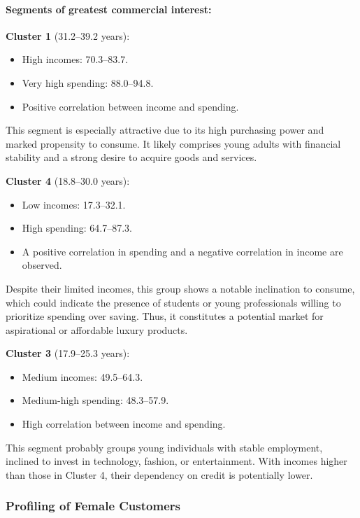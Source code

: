 \documentclass[10pt]{article}
\begin{document}
\paragraph{Segments of greatest commercial interest:}

\textbf{Cluster 1} (31.2--39.2 years):
\begin{itemize}
    \item High incomes: 70.3--83.7.
    \item Very high spending: 88.0--94.8.
    \item Positive correlation between income and spending.
\end{itemize}
This segment is especially attractive due to its high purchasing power and marked propensity to consume. It likely comprises young adults with financial stability and a strong desire to acquire goods and services.

\textbf{Cluster 4} (18.8--30.0 years):
\begin{itemize}
    \item Low incomes: 17.3--32.1.
    \item High spending: 64.7--87.3.
    \item A positive correlation in spending and a negative correlation in income are observed.
\end{itemize}
Despite their limited incomes, this group shows a notable inclination to consume, which could indicate the presence of students or young professionals willing to prioritize spending over saving. Thus, it constitutes a potential market for aspirational or affordable luxury products.

\textbf{Cluster 3} (17.9--25.3 years):
\begin{itemize}
    \item Medium incomes: 49.5--64.3.
    \item Medium-high spending: 48.3--57.9.
    \item High correlation between income and spending.
\end{itemize}
This segment probably groups young individuals with stable employment, inclined to invest in technology, fashion, or entertainment. With incomes higher than those in Cluster 4, their dependency on credit is potentially lower.



\subsubsection{Profiling of Female Customers}
\end{document}

